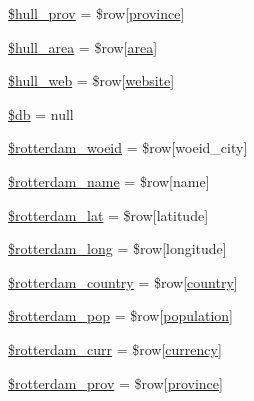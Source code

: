 \begin{DoxyCompactItemize}
\item 
\mbox{\hyperlink{index_8php_a5a22018a71078063c322b9d9c28b248e}{\$hull\+\_\+prov}} = \$row\mbox{[}\textquotesingle{}\mbox{\hyperlink{index_8php_a38d70414c65575df5643ad4296c9db2e}{province}}\textquotesingle{}\mbox{]}
\item 
\mbox{\hyperlink{index_8php_a4acd88460885f0c986cb80568d4635f3}{\$hull\+\_\+area}} = \$row\mbox{[}\textquotesingle{}\mbox{\hyperlink{index_8php_a5198216176428aa2303311f956213f33}{area}}\textquotesingle{}\mbox{]}
\item 
\mbox{\hyperlink{index_8php_a5acbf72a3c5ccb817baae0bbb0daf2c8}{\$hull\+\_\+web}} = \$row\mbox{[}\textquotesingle{}\mbox{\hyperlink{index_8php_a8c56014cff17c1ced653aa98455da680}{website}}\textquotesingle{}\mbox{]}
\item 
\mbox{\hyperlink{index_8php_a1fa3127fc82f96b1436d871ef02be319}{\$db}} = null
\item 
\mbox{\hyperlink{index_8php_a7ff0c47a623b98fd9f9e0dee5abbefcd}{\$rotterdam\+\_\+woeid}} = \$row\mbox{[}\textquotesingle{}woeid\+\_\+city\textquotesingle{}\mbox{]}
\item 
\mbox{\hyperlink{index_8php_a0780d98281b29a8000a31c4df7de97a5}{\$rotterdam\+\_\+name}} = \$row\mbox{[}\textquotesingle{}name\textquotesingle{}\mbox{]}
\item 
\mbox{\hyperlink{index_8php_a8b6b05e0c62675c3c8477cb3128d546c}{\$rotterdam\+\_\+lat}} = \$row\mbox{[}\textquotesingle{}latitude\textquotesingle{}\mbox{]}
\item 
\mbox{\hyperlink{index_8php_a5a22865a4d2173cb8eb524d226a98331}{\$rotterdam\+\_\+long}} = \$row\mbox{[}\textquotesingle{}longitude\textquotesingle{}\mbox{]}
\item 
\mbox{\hyperlink{index_8php_a14facdd37996bc41b1e5db7e1dc56f94}{\$rotterdam\+\_\+country}} = \$row\mbox{[}\textquotesingle{}\mbox{\hyperlink{index_8php_a0f0752705301c982dc8994ebc993e6e9}{country}}\textquotesingle{}\mbox{]}
\item 
\mbox{\hyperlink{index_8php_a2a52e2eb9ee3b164cd210abb0cce25a7}{\$rotterdam\+\_\+pop}} = \$row\mbox{[}\textquotesingle{}\mbox{\hyperlink{index_8php_aa78fa356925cd3f67d485c4d6846202b}{population}}\textquotesingle{}\mbox{]}
\item 
\mbox{\hyperlink{index_8php_a34d2fd40789c8407df48306bcd61a785}{\$rotterdam\+\_\+curr}} = \$row\mbox{[}\textquotesingle{}\mbox{\hyperlink{index_8php_abd84e0698c321abdbf211d5b8425d0b5}{currency}}\textquotesingle{}\mbox{]}
\item 
\mbox{\hyperlink{index_8php_abc96df293e0693d8819f0d9f9b239dfe}{\$rotterdam\+\_\+prov}} = \$row\mbox{[}\textquotesingle{}\mbox{\hyperlink{index_8php_a38d70414c65575df5643ad4296c9db2e}{province}}\textquotesingle{}\mbox{]}

\end{DoxyCompactItemize}
